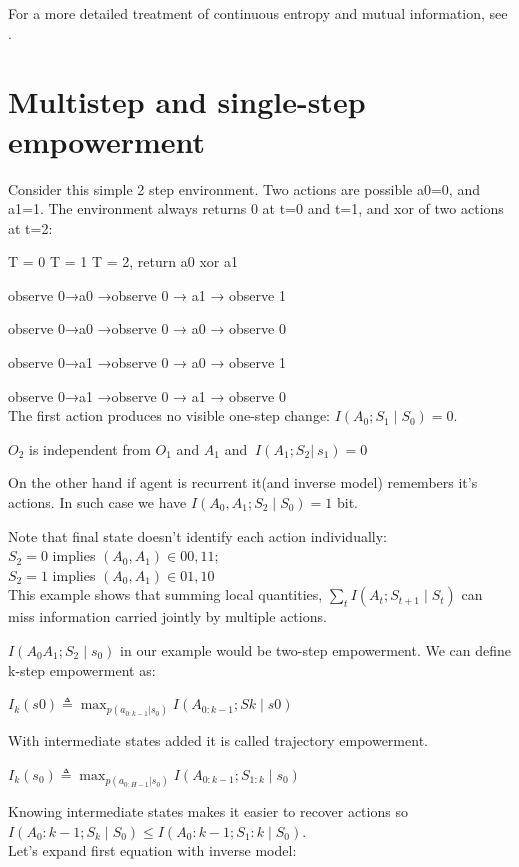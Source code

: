 For a more detailed treatment of continuous entropy and mutual information, see \cite{michalowicz2013handbook}.

\section{Multistep and single-step empowerment}\label{multistep-and-single-step-empowerment}

Consider this simple 2 step environment. Two actions are possible a0=0, and a1=1. The environment always returns 0 at t=0 and t=1, and xor of two actions at t=2:

T = 0 T = 1 T = 2, return a0 xor a1

observe 0→a0 →observe 0 → a1 → observe 1

observe 0→a0 →observe 0 → a0 → observe 0

observe 0→a1 →observe 0 → a0 → observe 1

observe 0→a1 →observe 0 → a1 → observe 0\\

The first action produces no visible one-step change:
$I(A_0;S_1∣S_0)=0$.

$O_{2}$ is independent from $O_{1}$ and $A_{1}$ and $\ I(A_{1};S_{2}|\ s_{1})  =  0$

On the other hand if agent is recurrent it(and inverse model) remembers it's actions. In such case we have $I(A_0, A_1;S_2∣S_0) = 1$ bit.

Note that final state doesn't identify each action individually:\\
$S_2=0$ implies $(A_0, A_1)∈ {00,11}$;\\
$S_2=1$ implies $(A_0, A_1) ∈{01,10}$\\

This example shows that summing local quantities,
$\sum_t I(A_t;S_{t+1}\mid S_t)$ can miss information carried jointly by multiple actions.

$I(A_{0}A_{1};S_{2} \mid s_{0})$ in our example would be two-step empowerment. We can define k-step empowerment as:

$I_{k}(s0)  \triangleq  \max_{p(a_{0:k-1}|s_0)} I(A_{0:k - 1} ; Sk \mid s0) $

With intermediate states added it is called trajectory empowerment.

$I_{k}(s_0)  \triangleq \max_{p(a_{0:H-1}|s_0)}  I(A_{0: k - 1} ; S_{1: k} \mid s_{0})$

Knowing intermediate states makes it easier to recover actions so $I(A_0:k−1;S_k∣S_0) ≤ I(A_0:k−1;S_1:k∣S_0)$.\\
Let's expand first equation with inverse model:

